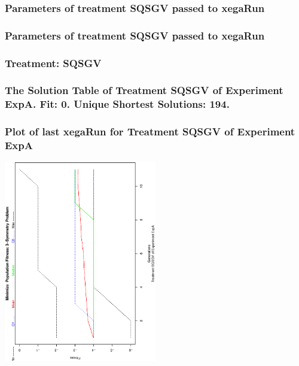 \documentclass[18pt,c]{beamer}
\begin{document}
 \begin{frame}
 \fontsize{8pt}{9pt}\selectfont
 \frametitle{  Parameters of treatment SQSGV passed to xegaRun
 }

 \label{ExpAtParmTable022.tex}  
 \end{frame}


 \begin{frame}
 \fontsize{8pt}{9pt}\selectfont
 \frametitle{  Parameters of treatment SQSGV passed to xegaRun
 }

 \label{ExpAtParmTable023.tex}  
 \end{frame}

 \begin{frame}
 \fontsize{8pt}{9pt}\selectfont
 \frametitle{ Treatment: SQSGV }

 \label{ExpAStatsTable020.tex}  
 \end{frame}

 \begin{frame}
 \fontsize{8pt}{9pt}\selectfont
 \frametitle{ The Solution Table of Treatment SQSGV of Experiment ExpA. Fit: 0. Unique Shortest Solutions: 194. }

 \label{ExpASolutionTable005.tex}  
 \end{frame}

 \begin{frame}
 \frametitle{ Plot of last xegaRun for Treatment SQSGV of Experiment ExpA }
 \begin{center}
\includegraphics[width=0.5\textwidth, angle=-90]
{ExpAPlotPopStatsFigure005.eps}
 \end{center}
 \label{report/ExpAPlotPopStatsFigure005.eps}  
 \end{frame}
\end{document}
